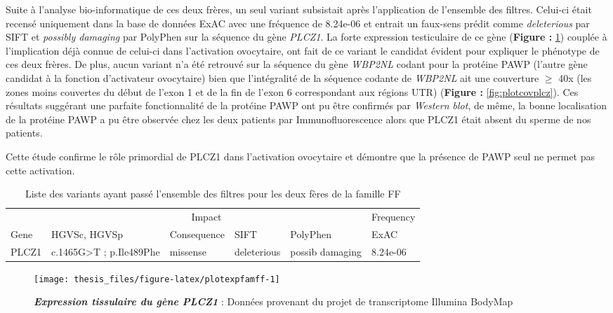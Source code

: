 \documentclass[12pt,a4paper,twoside]{ugathesis}
\begin{document}
Suite à l'analyse bio-informatique de ces deux frères, un seul variant
subsistait après l'application de l'ensemble des filtres. Celui-ci était
recensé uniquement dans la base de données ExAC avec une fréquence de
8.24e-06 et entrait un faux-sens prédit comme \emph{deleterious} par
SIFT et \emph{possibly damaging} par PolyPhen sur la séquence du gène
\emph{PLCZ1}. La forte expression testiculaire de ce gène
(\textbf{Figure : }\ref{fig:plotexpfamff}) couplée à l'implication déjà
connue de celui-ci dans l'activation ovocytaire, ont fait de ce variant
le candidat évident pour expliquer le phénotype de ces deux frères. De
plus, aucun variant n'a été retrouvé sur la séquence du gène
\emph{WBP2NL} codant pour la protéine PAWP (l'autre gène candidat à la
fonction d'activateur ovocytaire) bien que l'intégralité de la séquence
codante de \emph{WBP2NL} ait une couverture \(\ge\) 40x (les zones moins
couvertes du début de l'exon 1 et de la fin de l'exon 6 correspondant
aux régions UTR) (\textbf{Figure : }\ref{fig:plotcovplcz}). Ces
résultats suggérant une parfaite fonctionnalité de la protéine PAWP ont
pu être confirmés par \emph{Western blot}, de même, la bonne
localisation de la protéine PAWP a pu être observée chez les deux
patients par Immunofluorescence alors que PLCZ1 était absent du sperme
de nos patients.

Cette étude confirme le rôle primordial de PLCZ1 dans l'activation
ovocytaire et démontre que la présence de PAWP seul ne permet pas cette
activation.

\begin{longtable}[t]{llllll}
\caption{\label{tab:tabrecapff}Liste des variants ayant passé l'ensemble des filtres pour les deux fères de la famille FF}\\
\toprule
\multicolumn{1}{c}{ } & \multicolumn{4}{c}{Impact} & \multicolumn{1}{c}{Frequency} \\
\cmidrule(l{2pt}r{2pt}){2-5} \cmidrule(l{2pt}r{2pt}){6-6}
Gene & HGVSc, HGVSp & Consequence & SIFT & PolyPhen & ExAC\\
\midrule
PLCZ1 & c.1465G>T ; p.Ile489Phe & missense & deleterious & possib damaging & 8.24e-06\\
\bottomrule
\end{longtable}

\newpage

\begin{figure}

{\centering \texttt{[image: thesis\_files/figure-latex/plotexpfamff-1]} 

}

\caption[Expression tissulaire du gène \emph{PLCZ1}]{\textbf{\emph{Expression tissulaire du gène
\emph{PLCZ1}}} : Données provenant du projet de transcriptome Illumina
BodyMap}\label{fig:plotexpfamff}
\end{figure}
\end{document}
